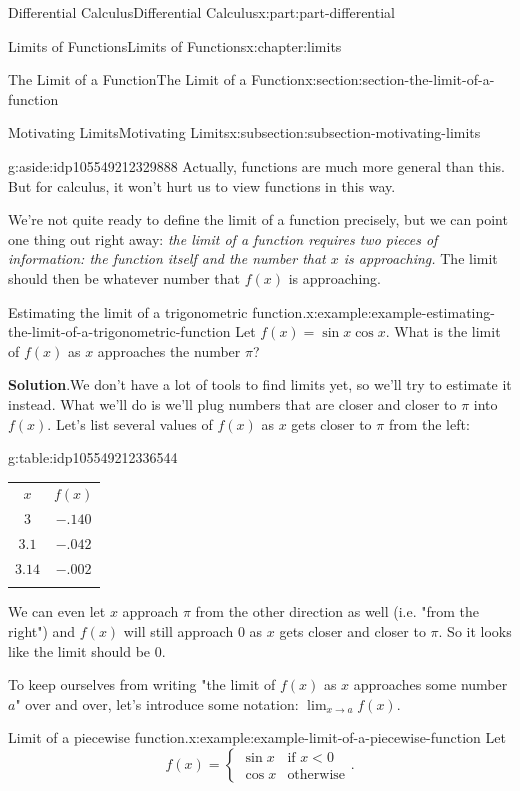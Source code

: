 \documentclass[twoside,10pt,]{book}
\newcommand{\blocktitlefont}{\relax}
\newcommand{\tabularfont}{\relax}
\numberwithin{equation}{part}
\newcommand{\hrulethin}  {\noalign{\hrule height 0.04em}}
\newcommand{\hrulethick} {\noalign{\hrule height 0.11em}}
\begin{document}
\begin{partptx}{Differential Calculus}{}{Differential Calculus}{}{}{x:part:part-differential}
\begin{chapterptx}{Limits of Functions}{}{Limits of Functions}{}{}{x:chapter:limits}
\begin{sectionptx}{The Limit of a Function}{}{The Limit of a Function}{}{}{x:section:section-the-limit-of-a-function}
\begin{subsectionptx}{Motivating Limits}{}{Motivating Limits}{}{}{x:subsection:subsection-motivating-limits}
\begin{aside}{}{g:aside:idp105549212329888}%
Actually, functions are much more general than this. But for calculus, it won't hurt us to view functions in this way.%
\end{aside}
We're not quite ready to define the limit of a function precisely, but we can point one thing out right away: \emph{the limit of a function requires two pieces of information: the function itself and the number that \(x\) is approaching.} The limit should then be whatever number that \(f(x)\) is approaching.%
\begin{example}{Estimating the limit of a trigonometric function.}{x:example:example-estimating-the-limit-of-a-trigonometric-function}%
Let \(f(x) = \sin x\cos x\). What is the limit of \(f(x)\) as \(x\) approaches the number \(\pi\)?%
\par\smallskip%
\noindent\textbf{\blocktitlefont Solution}.\hypertarget{g:solution:idp105549212334240}{}\quad{}We don't have a lot of tools to find limits yet, so we'll try to estimate it instead. What we'll do is we'll plug numbers that are closer and closer to \(\pi\) into \(f(x)\). Let's list several values of \(f(x)\) as \(x\) gets closer to \(\pi\) from the left:%
\begin{tableptx}{\textbf{}}{g:table:idp105549212336544}{}%
\centering%
{\tabularfont%
\begin{tabular}{cc}\hrulethick
\(x\)&\(f(x)\)\tabularnewline\hrulethin
\(3\)&\(-.140\)\tabularnewline[0pt]
\(3.1\)&\(-.042\)\tabularnewline[0pt]
\(3.14\)&\(-.002\)\tabularnewline\hrulethick
\end{tabular}
}%
\end{tableptx}%
We can even let \(x\) approach \(\pi\) from the other direction as well (i.e. "from the right") and \(f(x)\) will still approach \(0\) as \(x\) gets closer and closer to \(\pi\). So it looks like the limit should be \(0\).%
\end{example}
To keep ourselves from writing "the limit of \(f(x)\) as \(x\) approaches some number \(a\)" over and over, let's introduce some notation: \(\lim_{x\to a}f(x)\).%
\begin{example}{Limit of a piecewise function.}{x:example:example-limit-of-a-piecewise-function}%
Let%
%
\begin{equation*}
f(x) = \begin{cases} \sin x & \text{if $x<0$} \\ \cos x & \text{otherwise} \end{cases}.
\end{equation*}

\end{example}
\end{subsectionptx}
\end{sectionptx}
\end{chapterptx}
\end{partptx}
\end{document}
